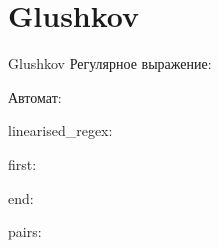 \section{Glushkov}
\begin{frame}{Glushkov}
	Регулярное выражение:

	Автомат:


	linearised_regex:


	first:


	end:


	pairs:


\end{frame}




